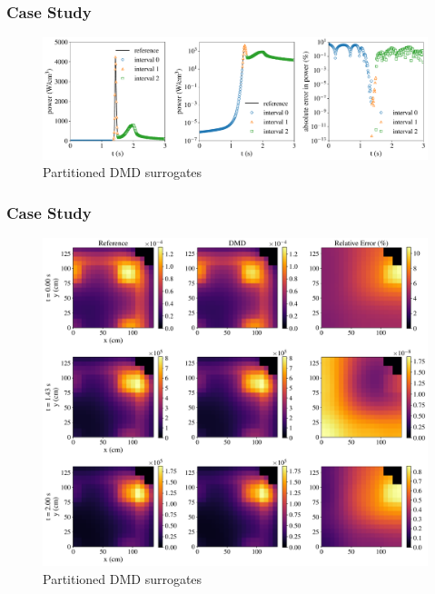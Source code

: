 \documentclass[fleqn]{beamer}
\begin{document}
\begin{frame}
\frametitle{Case Study}
\begin{figure}[ht]
\includegraphics[scale=0.3]{corepower.pdf}
\caption{Partitioned DMD surrogates}
\end{figure}
\end{frame}

\begin{frame}
\frametitle{Case Study}
\begin{figure}[ht]
\includegraphics[scale=0.18]{meshpower.pdf}
\caption{Partitioned DMD surrogates}
\end{figure}
\end{frame}
\end{document}
